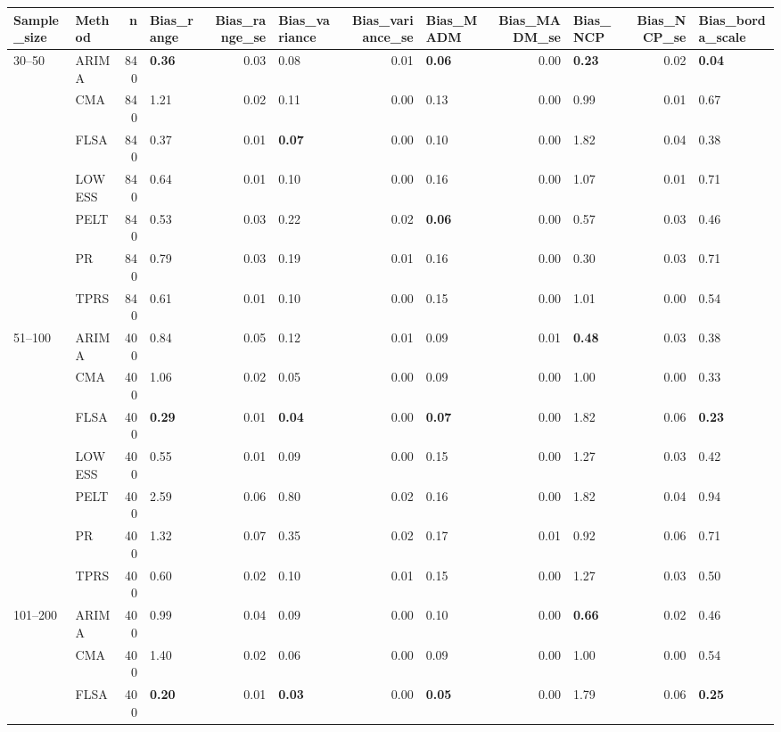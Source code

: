 \begin{table}[ht]
\centering
\begin{tabular}{llrlrlrlrlrl}
  \toprule
Sample_size & Method & n & Bias_range & Bias_range_se & Bias_variance & Bias_variance_se & Bias_MADM & Bias_MADM_se & Bias_NCP & Bias_NCP_se & Bias_borda_scale \\ 
  \midrule
30–50 & ARIMA & 840 & \textbf{0.36} & 0.03 & 0.08 & 0.01 & \textbf{0.06} & 0.00 & \textbf{0.23} & 0.02 & \textbf{0.04} \\ 
   & CMA & 840 & 1.21 & 0.02 & 0.11 & 0.00 & 0.13 & 0.00 & 0.99 & 0.01 & 0.67 \\ 
   & FLSA & 840 & 0.37 & 0.01 & \textbf{0.07} & 0.00 & 0.10 & 0.00 & 1.82 & 0.04 & 0.38 \\ 
   & LOWESS & 840 & 0.64 & 0.01 & 0.10 & 0.00 & 0.16 & 0.00 & 1.07 & 0.01 & 0.71 \\ 
   & PELT & 840 & 0.53 & 0.03 & 0.22 & 0.02 & \textbf{0.06} & 0.00 & 0.57 & 0.03 & 0.46 \\ 
   & PR & 840 & 0.79 & 0.03 & 0.19 & 0.01 & 0.16 & 0.00 & 0.30 & 0.03 & 0.71 \\ 
   & TPRS & 840 & 0.61 & 0.01 & 0.10 & 0.00 & 0.15 & 0.00 & 1.01 & 0.00 & 0.54 \\ 
  51–100 & ARIMA & 400 & 0.84 & 0.05 & 0.12 & 0.01 & 0.09 & 0.01 & \textbf{0.48} & 0.03 & 0.38 \\ 
   & CMA & 400 & 1.06 & 0.02 & 0.05 & 0.00 & 0.09 & 0.00 & 1.00 & 0.00 & 0.33 \\ 
   & FLSA & 400 & \textbf{0.29} & 0.01 & \textbf{0.04} & 0.00 & \textbf{0.07} & 0.00 & 1.82 & 0.06 & \textbf{0.23} \\ 
   & LOWESS & 400 & 0.55 & 0.01 & 0.09 & 0.00 & 0.15 & 0.00 & 1.27 & 0.03 & 0.42 \\ 
   & PELT & 400 & 2.59 & 0.06 & 0.80 & 0.02 & 0.16 & 0.00 & 1.82 & 0.04 & 0.94 \\ 
   & PR & 400 & 1.32 & 0.07 & 0.35 & 0.02 & 0.17 & 0.01 & 0.92 & 0.06 & 0.71 \\ 
   & TPRS & 400 & 0.60 & 0.02 & 0.10 & 0.01 & 0.15 & 0.00 & 1.27 & 0.03 & 0.50 \\ 
  101–200 & ARIMA & 400 & 0.99 & 0.04 & 0.09 & 0.00 & 0.10 & 0.00 & \textbf{0.66} & 0.02 & 0.46 \\ 
   & CMA & 400 & 1.40 & 0.02 & 0.06 & 0.00 & 0.09 & 0.00 & 1.00 & 0.00 & 0.54 \\ 
   & FLSA & 400 & \textbf{0.20} & 0.01 & \textbf{0.03} & 0.00 & \textbf{0.05} & 0.00 & 1.79 & 0.06 & \textbf{0.25} \\ 

\end{tabular}
\end{table}
